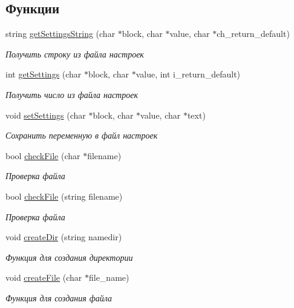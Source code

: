 \subsection*{Функции}
\begin{DoxyCompactItemize}
\item 
string \mbox{\hyperlink{group__settingscpp_ga50535cebf45c8d7cbffd29274699e5f5}{get\+Settings\+String}} (char $\ast$block, char $\ast$value, char $\ast$ch\+\_\+return\+\_\+default)
\begin{DoxyCompactList}\small\item\em Получить строку из файла настроек \end{DoxyCompactList}\item 
int \mbox{\hyperlink{group__settingscpp_ga0a2fe94de4037eda33c49fe332970891}{get\+Settings}} (char $\ast$block, char $\ast$value, int i\+\_\+return\+\_\+default)
\begin{DoxyCompactList}\small\item\em Получить число из файла настроек \end{DoxyCompactList}\item 
void \mbox{\hyperlink{group__settingscpp_ga463e32ccb37f9478b0e62ee0d21c5999}{set\+Settings}} (char $\ast$block, char $\ast$value, char $\ast$text)
\begin{DoxyCompactList}\small\item\em Сохранить переменную в файл настроек \end{DoxyCompactList}\item 
bool \mbox{\hyperlink{group__settingscpp_ga2dd1bc039652a0480c444957d416b6a6}{check\+File}} (char $\ast$filename)
\begin{DoxyCompactList}\small\item\em Проверка файла \end{DoxyCompactList}\item 
bool \mbox{\hyperlink{group__settingscpp_ga64f8c9899c815dc180b2b564c0d05762}{check\+File}} (string filename)
\begin{DoxyCompactList}\small\item\em Проверка файла \end{DoxyCompactList}\item 
void \mbox{\hyperlink{group__settingscpp_ga5ac0cd45ecb6e65e3ace40687d6ee8bc}{create\+Dir}} (string namedir)
\begin{DoxyCompactList}\small\item\em Функция для создания директории \end{DoxyCompactList}\item 
void \mbox{\hyperlink{group__settingscpp_ga8f34a2030acfb5567678ab2bba25f3c1}{create\+File}} (char $\ast$file\+\_\+name)
\begin{DoxyCompactList}\small\item\em Функция для создания файла \end{DoxyCompactList}\end{DoxyCompactItemize}


